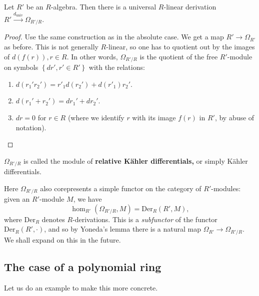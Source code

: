 \begin{proposition} 
Let $R'$ be an $R$-algebra.
Then there is a universal $R$-linear derivation $R'
\stackrel{d_{\mathrm{univ}}}{\to} \Omega_{R'/R}$.
\end{proposition} 
\begin{proof} 
Use the same construction as in the absolute case. We get a map $R' \to
\Omega_{R'}$ as before. This is not generally $R$-linear, so one has to
quotient out by the images of $d(f(r)), r \in R$.
In other words, $\Omega_{R'/R}$ is the quotient of the free $R'$-module on
symbols $\left\{dr', r' \in R'\right\}$ with the relations:
\begin{enumerate}
\item $d(r_1' r_2') = r'_1 d(r_2') + d(r'_1) r_2'$. 
\item $d(r_1' + r_2') = dr_1' + dr_2'$.
\item  $dr = 0$ for $r \in R$ (where we identify $r$ with its image $f(r)$ in
$R'$, by abuse of notation).
\end{enumerate}
\end{proof} 

\begin{definition} 
$\Omega_{R'/R}$ is called the module of \textbf{relative K\"ahler
differentials,} or simply K\"ahler differentials.
\end{definition} 

Here $\Omega_{R'/R}$ also corepresents a simple functor on the category of
$R'$-modules: given an $R'$-module $M$, we have
\[ \hom_{R'}(\Omega_{R'/R}, M) = \mathrm{Der}_R(R', M),  \]
where $\mathrm{Der}_R$ denotes $R$-derivations.
This is a \emph{subfunctor} of the functor $\mathrm{Der}_R(R', \cdot)$, and so
by Yoneda's lemma there is a natural map $\Omega_{R'} \to \Omega_{R'/R}$.
We shall expand on this in the future.

\subsection{The case of a polynomial ring}
Let us do an example to make this more concrete.

